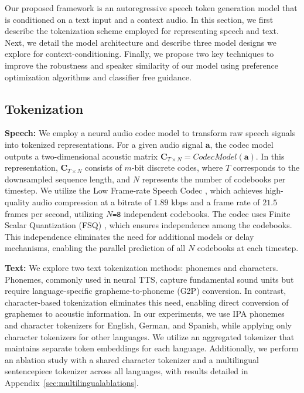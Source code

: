 
Our proposed framework is an autoregressive speech token generation model that is conditioned on a text input and a context audio.
In this section, 
we first
describe the tokenization scheme employed for representing speech and text. Next, we detail the model architecture and describe three model designs we explore for context-conditioning.
Finally, we propose two key techniques to improve the robustness and speaker similarity of our model using preference optimization algorithms and classifier free guidance.

\subsection{Tokenization}
\textbf{Speech:} We employ a neural audio codec model to transform raw speech signals into tokenized representations. For a given audio signal $\mathbf{a}$, the codec model outputs a two-dimensional acoustic matrix $\mathbf{C}_{T \times N}=\textit{CodecModel}(\mathbf{a})$. In this representation, $\mathbf{C}_{T \times N}$ consists of $m$-bit discrete codes, where $T$ corresponds to the downsampled sequence length, and $N$ represents the number of codebooks per timestep. We utilize the Low Frame-rate Speech Codec \cite{casanova2024low}, which achieves high-quality audio compression at a bitrate of $1.89$ kbps and a frame rate of $21.5$ frames per second, utilizing $N$\texttt{=8} independent codebooks.  
The codec uses  Finite Scalar Quantization (FSQ) \cite{mentzer2024finite}, which ensures independence among the codebooks. 
This independence eliminates the need for additional models or delay mechanisms, enabling the parallel prediction of all $N$ codebooks at each timestep.

\textbf{Text:} 
We explore two text tokenization methods: phonemes and characters. Phonemes, commonly used in neural TTS, capture fundamental sound units but require language-specific grapheme-to-phoneme (G2P) conversion. In contrast, character-based tokenization eliminates this need, enabling direct conversion of graphemes to acoustic information. In our experiments, we use IPA phonemes and character tokenizers for English, German, and Spanish, while applying only character tokenizers for other languages.
We utilize an aggregated tokenizer that maintains separate token embeddings for each language. Additionally, we perform an ablation study with a shared character tokenizer and a multilingual sentencepiece tokenizer across all languages, with results detailed in Appendix~\ref{sec:multilingualablations}.

